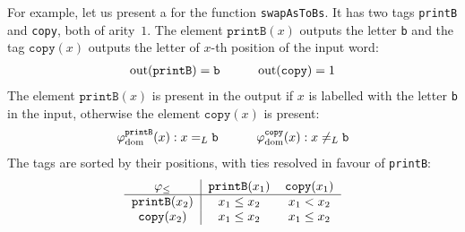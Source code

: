 For example, let us present a  for the function \texttt{swapAsToBs}. 
It has two tags \texttt{printB} and \texttt{copy}, both of arity~$1$. 
The element $\mathtt{printB}(x)$ outputs the letter \texttt{b} and the tag $\mathtt{copy}(x)$
outputs the letter of $x$-th position of the input word:
\[
\begin{tabular}{ccc}
    $\text{out}(\mathtt{printB}) = \mathtt{b}$ & \ \ \ & $\text{out}(\mathtt{copy}) = 1$ \\
\end{tabular}
\]
The element $\mathtt{printB}(x)$ is present in the output if $x$ is labelled with the letter \texttt{b}
in the input, otherwise the element $\mathtt{copy}(x)$ is present:
\[
\begin{tabular}{ccc}
    $\varphi_{\text{dom}}^{\mathtt{printB}}(x) : x =_L \mathtt{b}$ & \ \ \  &$\varphi_{\text{dom}}^{\mathtt{copy}}(x) : x \neq_L \mathtt{b}$ \\
\end{tabular}
\]
The tags are sorted by their positions, with ties resolved in favour of \texttt{printB}:
\[ 
\begin{tabular}{c|cc}
    $\varphi_{\leq}$ & $\mathtt{printB}(x_1)$ & $\mathtt{copy}(x_1)$ \\
    \hline
    $\mathtt{printB}(x_2)$ & $x_1 \leq x_2$ & $x_1 < x_2$ \\
    $\mathtt{copy}(x_2)$ & $x_1 \leq x_2$ & $x_1 \leq x_2$ \\
\end{tabular}
\]
